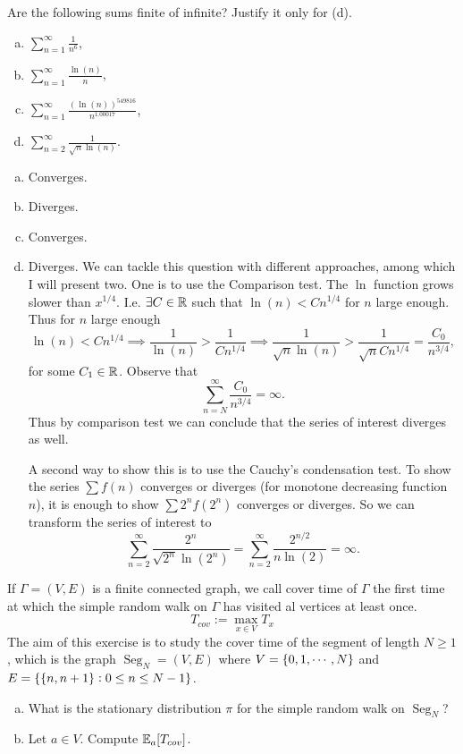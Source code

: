 \begin{problem}
	Are the following sums finite of infinite? Justify it only for (d).
	\begin{enumerate}[(a)]
		\item $\sum_{n=1}^{\infty}\frac{1}{n^6}$,
		\item $\sum_{n=1}^{\infty}\frac{\ln(n)}{n}$,
		\item $\sum_{n=1}^{\infty}\frac{(\ln(n))^{549816}}{n^{1.00017}}$,
		\item $\sum_{n=2}^{\infty}\frac{1}{\sqrt{n}\ln(n)}$.
	\end{enumerate}
\end{problem}

\begin{solution}
	\begin{enumerate}[(a)]
		\item Converges.
		\item Diverges.
		\item Converges.
		\item Diverges.
		We can tackle this question with different approaches, among which I will present two. One is to use the Comparison test. The $\ln$ function grows slower than $x^{1/4}$. I.e. $\exists C \in \mathbb{R}$ such that $\ln(n) < Cn^{1/4}$ for $n$ large enough. Thus for $n$ large enough
		\[ \ln(n) < Cn^{1/4} \implies  \frac{1}{\ln(n)}>\frac{1}{Cn^{1/4}} \implies \frac{1}{\sqrt{n}\ln(n)}>\frac{1}{\sqrt{n}Cn^{1/4}} = \frac{C_0}{n^{3/4}}, \]
		for some $C_1 \in \mathbb{R}$. Observe that
		\[ \sum_{n=N}^{\infty}\frac{C_0}{n^{3/4}} = \infty. \]
		Thus by comparison test we can conclude that the series of interest diverges as well.
		
		A second way to show this is to use the Cauchy's condensation test. To show the series $\sum f(n)$ converges or diverges (for monotone decreasing function $n$), it is enough to show $\sum 2^n f(2^n)$ converges or diverges. So we can transform the series of interest to 
		\[ \sum_{n=2}^{\infty}\frac{2^n}{\sqrt{2^n}\ln(2^n)} = \sum_{n=2}^{\infty} \frac{2^{n/2}}{n\ln(2)}  = \infty.\]
	\end{enumerate}
\end{solution}



\begin{problem}
	If $\Gamma = (V,E)$ is a finite connected graph, we call cover time of $\Gamma$ the first time at which the simple random walk on $\Gamma$ has visited al vertices at least once.
	\[ T_{cov} := \max_{x\in V} T_x \]
	The aim of this exercise is to study the cover time of the segment of length $N\geq 1$, which is the graph $\operatorname{Seg}_N = (V,E)$ where $V = \{0,1,\cdots,N\}$ and $E = \{\{n,n+1\}:0\leq n \leq N-1\}$.
	\begin{enumerate}[(a),itemsep=0pt]
		\item What is the stationary distribution $\pi$ for the simple random walk on $\operatorname{Seg}_N$?
		\item Let $a \in V$. Compute $\mathbb{E}_a[T_{cov}]$.
	\end{enumerate}
\end{problem}


